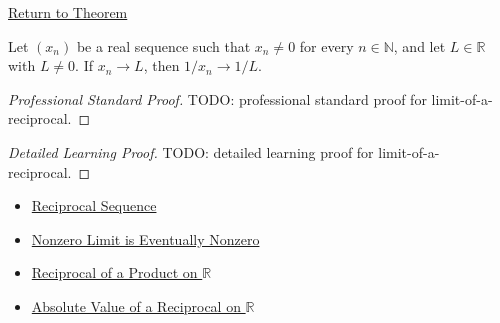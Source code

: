 \newpage
{}
\label{prf:limit-of-a-reciprocal}

\begin{remark*}[Return]
\hyperref[thm:limit-of-a-reciprocal]{Return to Theorem}
\end{remark*}

\begin{theorem*}
Let $(x_n)$ be a real sequence such that $x_n\neq 0$ for every
$n\in\mathbb{N}$, and let $L\in\mathbb{R}$ with $L\neq 0$. If $x_n\to L$,
then $1/x_n\to 1/L$.

\smallskip
\noindent
\end{theorem*}

\begin{proof}[Professional Standard Proof]
\LRAProofBodyStart
TODO: professional standard proof for limit-of-a-reciprocal.
\end{proof}

\begin{proof}[Detailed Learning Proof]
\LRAProofBodyStart
TODO: detailed learning proof for limit-of-a-reciprocal.
\end{proof}

\begin{remark*}
\end{remark*}

\begin{dependencies}
\begin{itemize}
  \item \hyperref[def:reciprocal-sequence]{Reciprocal Sequence}
  \item \hyperref[thm:nonzero-limit-eventually-nonzero]{Nonzero Limit is Eventually Nonzero}
  \item \hyperref[thm:reciprocal-of-product-on-r]{Reciprocal of a Product on $\mathbb{R}$}
  \item \hyperref[thm:absolute-value-of-reciprocal-r]{Absolute Value of a Reciprocal on $\mathbb{R}$}
\end{itemize}
\end{dependencies}

\clearpage
